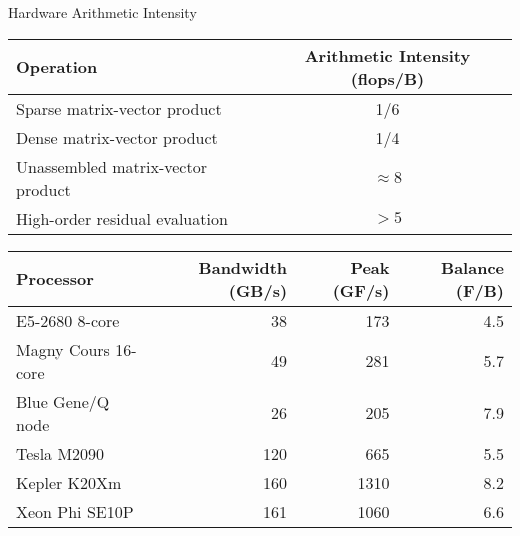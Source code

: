 \begin{frame}{Hardware Arithmetic Intensity}
  \begin{tabular}{lc}
    \toprule
    Operation                         & Arithmetic Intensity (flops/B) \\
    \midrule
    Sparse matrix-vector product      & 1/6                  \\
    Dense matrix-vector product       & 1/4                  \\
    Unassembled matrix-vector product & $\approx 8$          \\
    High-order residual evaluation    & $> 5$                \\
    \bottomrule
  \end{tabular}

  \bigskip

  \begin{tabular}{lrrr}
    \toprule
    Processor & Bandwidth (GB/s) & Peak (GF/s) & Balance (F/B) \\
    \midrule
    E5-2680 8-core      & 38   & 173  & 4.5 \\ %
    Magny Cours 16-core & 49   & 281  & 5.7 \\
    Blue Gene/Q node    & 26   & 205  & 7.9 \\
    Tesla M2090         & 120  & 665  & 5.5 \\
    Kepler K20Xm        & 160 & 1310 & 8.2 \\ %
    Xeon Phi SE10P      & 161 & 1060 & 6.6 \\ %
    \bottomrule
  \end{tabular}
\end{frame}
